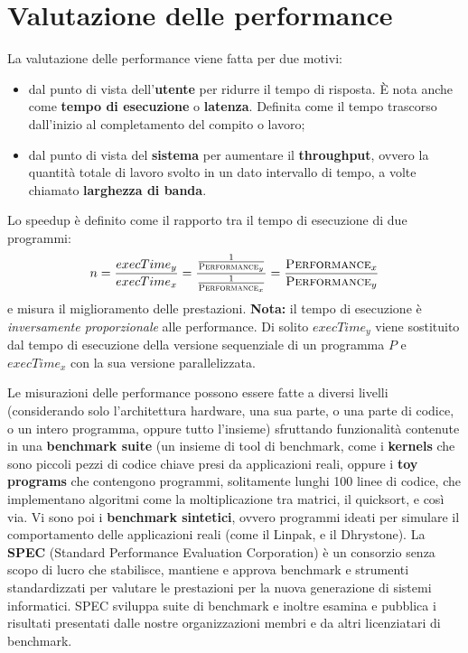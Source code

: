 \section{Valutazione delle performance}
La valutazione delle performance viene fatta per due motivi:
\begin{itemize}
    \item dal punto di vista dell'\textbf{utente} per ridurre il tempo di risposta. È nota anche come \textbf{tempo di esecuzione} o \textbf{latenza}. Definita come il tempo trascorso dall'inizio al completamento del compito o lavoro;

\item dal punto di vista del \textbf{sistema} per aumentare il \textbf{throughput}, ovvero la quantità totale di lavoro svolto in un dato intervallo di tempo, a volte chiamato \textbf{larghezza di banda}.

\end{itemize}

Lo speedup è definito come il rapporto tra il tempo di esecuzione di due programmi:
\begin{equation*}
	n=\frac{execTime_y}{execTime_x}
	=\frac{\frac{1}{\textsc{Performance}_y}}{\frac{1}{\textsc{Performance}_x}}=\frac{\textsc{Performance}_x}{\textsc{Performance}_y}
\end{equation*}
e misura il miglioramento delle prestazioni. \textbf{Nota:} il tempo di esecuzione è \textit{inversamente proporzionale} alle performance. Di solito $execTime_y$ viene sostituito dal tempo di esecuzione della versione sequenziale di un programma $P$ e $execTime_x$ con la sua versione parallelizzata.

Le misurazioni delle performance possono essere fatte a diversi livelli (considerando solo l'architettura hardware, una sua parte, o una parte di codice, o un intero programma, oppure tutto l'insieme) sfruttando funzionalità contenute in una \textbf{benchmark suite} (un insieme di tool di benchmark, come i \textbf{kernels} che sono piccoli pezzi di codice chiave presi da applicazioni reali, oppure i \textbf{toy programs} che contengono programmi, solitamente lunghi 100 linee di codice, che implementano algoritmi come la moltiplicazione tra matrici, il quicksort, e così via. Vi sono poi i \textbf{benchmark sintetici}, ovvero programmi ideati per simulare il comportamento delle applicazioni reali (come il Linpak, e il Dhrystone). La \textbf{SPEC} (Standard Performance Evaluation Corporation) è un consorzio senza scopo di lucro che stabilisce, mantiene e approva benchmark e strumenti standardizzati per valutare le prestazioni per la nuova generazione di sistemi informatici. SPEC sviluppa suite di benchmark e inoltre esamina e pubblica i risultati presentati dalle nostre organizzazioni membri e da altri licenziatari di benchmark.

